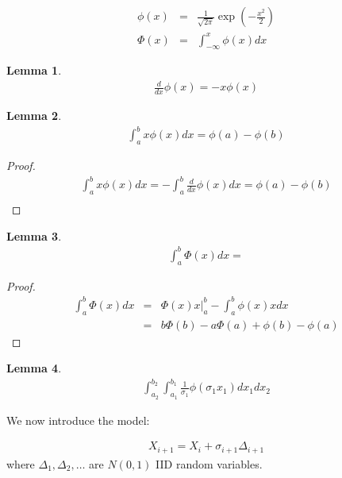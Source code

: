 \documentclass{article}
\newtheorem{lemma}{Lemma}
\begin{document}
\begin{eqnarray*}
  \phi(x) & = & \frac{1}{\sqrt{2\pi}}\exp\left(-\frac{x^2}{2}\right)\\
  \Phi(x) & = & \int_{-\infty}^x \phi(x) d\!x
\end{eqnarray*}

\begin{lemma}
  \begin{eqnarray*}
    \frac{d}{d\!x}\phi(x) = -x \phi(x)
  \end{eqnarray*}
\end{lemma}

\begin{lemma}
  \begin{eqnarray*}
    \int_a^b x\phi(x)d\!x = \phi(a) - \phi(b)
  \end{eqnarray*}
\end{lemma}
\begin{proof}
  \begin{eqnarray*}
    \int_a^b x\phi(x)d\!x = -\int_a^b \frac{d}{d\!x}\phi(x)d\!x = \phi(a) - \phi(b)\\
  \end{eqnarray*}
\end{proof}

\begin{lemma}
  \begin{eqnarray*}
    \int_a^b \Phi(x) d\!x = 
  \end{eqnarray*}
\end{lemma}
\begin{proof}
  \begin{eqnarray*}
    \int_a^b \Phi(x) d\!x & = & \left.\Phi(x) x\right\vert_a^b - \int_a^b \phi(x) x d\!x\\
    & = & b \Phi(b) - a \Phi(a) + \phi(b) - \phi(a)
  \end{eqnarray*}
\end{proof}

\begin{lemma}
  \begin{eqnarray*}
    \int_{a_2}^{b_2}\int_{a_1}^{b_1} \frac{1}{\sigma_1}\phi\left( \sigma_1 x_1 \right)d\!x_1 d\!x_2
  \end{eqnarray*}
\end{lemma}

We now introduce the model:

\begin{eqnarray*}
  X_{i+1} = X_i + \sigma_{i+1} \Delta_{i+1}
\end{eqnarray*}
%
where $\Delta_1, \Delta_2, \ldots$ are $N(0,1)$ IID random variables.
\end{document}
